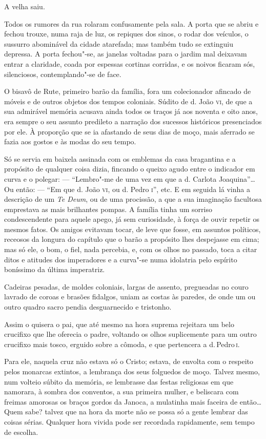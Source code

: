 A velha saiu.

Todos os rumores da rua rolaram confusamente pela sala. A porta que se
abriu e fechou trouxe, numa raja de luz, os repiques dos sinos, o rodar
dos veículos, o sussurro abominável da cidade atarefada; mas também tudo
se extinguiu depressa. A porta fechou"-se, as janelas voltadas para o
jardim mal deixavam entrar a claridade, coada por espessas cortinas
corridas, e os noivos ficaram sós, silenciosos, contemplando"-se de face.

\asterisc

O bisavô de Rute, primeiro barão da família, fora um colecionador
afincado de móveis e de outros objetos dos tempos coloniais. Súdito de
d. João \textsc{vi}, de que a sua admirável memória acusava ainda todos os traços
já aos noventa e oito anos, era sempre o seu assunto predileto a
narração dos sucessos históricos presenciados por ele. À proporção que
se ia afastando de seus dias de moço, mais aferrado se fazia aos gostos
e às modas do seu tempo.

Só se servia em baixela assinada com os emblemas da casa bragantina e a
propósito de qualquer coisa dizia, fincando o queixo agudo entre o
indicador em curva e o polegar: --- ``Lembro"-me de uma vez em que a d.
Carlota Joaquina''\ldots{} Ou então: --- ``Em que d. João \textsc{vi}, ou d. Pedro \textsc{i}'',
etc. E em seguida lá vinha a descrição de um \emph{Te Deum}, ou de uma
procissão, a que a sua imaginação facultosa emprestava as mais
brilhantes pompas. A família tinha um sorriso condescendente para aquele
apego, já sem curiosidade, à força de ouvir repetir os mesmos fatos. Os
amigos evitavam tocar, de leve que fosse, em assuntos políticos,
receosos da longura do capítulo que o barão a propósito lhes despejasse
em cima; mas só ele, o bom, o fiel, nada percebia, e, com os olhos no
passado, toca a citar ditos e atitudes dos imperadores e a curva"-se
numa idolatria pelo espírito boníssimo da última imperatriz.

Cadeiras pesadas, de moldes coloniais, largas de assento, pregueadas no
couro lavrado de coroas e brasões fidalgos, uniam as costas às paredes,
de onde um ou outro quadro sacro pendia desguarnecido e tristonho.

Assim o quisera o pai, que até mesmo na hora suprema rejeitara um belo
crucifixo que lhe oferecia o padre, voltando os olhos suplicemente para
um outro crucifixo mais tosco, erguido sobre a cômoda, e que pertencera
a d.\,Pedro\,\textsc{i}.

Para ele, naquela cruz não estava só o Cristo; estava, de envolta com o
respeito pelos monarcas extintos, a lembrança dos seus folguedos de
moço. Talvez mesmo, num volteio súbito da memória, se lembrasse das
festas religiosas em que namorara, à sombra dos conventos, a sua
primeira mulher, e beliscara com freimas amorosas os braços gordos da
Janoca, a mulatinha mais faceira de então\ldots{} Quem sabe? talvez que na
hora da morte não se possa só a gente lembrar das coisas sérias.
Qualquer hora vivida pode ser recordada rapidamente, sem tempo de
escolha.

